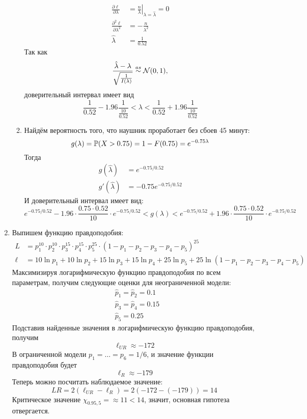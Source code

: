 \begin{enumerate}
\begin{enumerate}
\begin{align*}
\frac{\partial \ell}{\partial \lambda} &= \left. \frac{n}{\lambda} \right|_{\lambda = \hat \lambda} = 0 \\
\frac{\partial^2 \ell}{\partial \lambda^2} &= -\frac{n}{\lambda^2} \\
\hat \lambda &= \frac{1}{0.52}
\end{align*}
Так как
\[
\frac{\hat \lambda - \lambda}{\sqrt{\frac{1}{I(\lambda)}}} \stackrel{as}{\sim} \cN(0,1),
\]
доверительный интервал имеет вид
\[
\frac{1}{0.52} - 1.96 \frac{1}{\frac{10}{0.52}} < \lambda < \frac{1}{0.52} + 1.96 \frac{1}{\frac{10}{0.52}}
\]
\item Найдём вероятность того, что наушник проработает без сбоев 45 минут:
\[
g(\lambda) = \P(X > 0.75) = 1 - F(0.75) = e^{-0.75\lambda}
\]
Тогда
\begin{align*}
g(\hat \lambda) &= e^{-0.75 / 0.52} \\
g'(\hat \lambda) &= -0.75 e^{-0.75 / 0.52}
\end{align*}
И доверительный интервал имеет вид:
\[
e^{-0.75 / 0.52} - 1.96 \cdot \frac{0.75 \cdot 0.52}{10} \cdot e^{-0.75 / 0.52} < g(\lambda) < e^{-0.75 / 0.52} + 1.96 \cdot \frac{0.75 \cdot 0.52}{10} \cdot e^{-0.75 / 0.52}
\]
\end{enumerate}
\item Выпишем функцию правдоподобия:
\begin{align*}
L &= p_1^{10} \cdot p_2^{10} \cdot p_3^{15} \cdot p_4^{15} \cdot p_5^{25} \cdot (1 - p_1 - p_2 - p_3 - p_4 - p_5)^{25} \\
\ell &= 10 \ln p_1 + 10 \ln p_2 + 15 \ln p_3 + 15 \ln p_4 + 25 \ln p_5 + 25 \ln (1 - p_1 - p_2 - p_3 - p_4 - p_5)
\end{align*}
Максимизируя логарифмическую функцию правдоподобия по всем параметрам,
получим следующие оценки для неограниченной модели:
\begin{align*}
& \hat p_1 = \hat p_2 = 0.1 \\
& \hat p_3 = \hat p_4 = 0.15 \\
& \hat p_5 = 0.25
\end{align*}
Подставив найденные значения в логарифмическую функцию правдоподобия, получим
\[
\ell_{UR} \approx -172
\]
В ограниченной модели $p_1 = \ldots = p_6 = 1/6$, и значение функции правдоподобия
будет
\[
\ell_R \approx -179
\]
Теперь можно посчитать наблюдаемое значение:
\[
LR = 2(\ell_{UR} - \ell_R) = 2(-172 - (-179)) = 14
\]
Критическое значение $\chi_{0.95, 5} = \approx 11 < 14$, значит, основная гипотеза
отвергается.
\end{enumerate}
